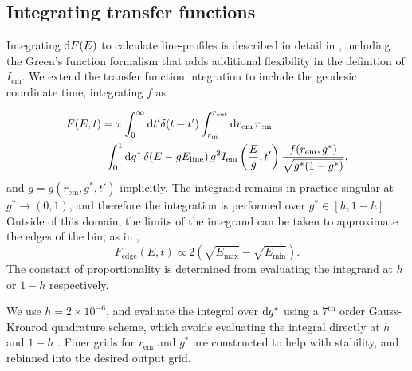 \subsection{Integrating transfer functions}

Integrating $\text{d} F(E)$ to calculate line-profiles is described in detail in \cite{dauser_broad_2010}, including the Green's function formalism that adds additional flexibility in the definition of $I_\text{em}$. We extend the transfer function integration to include the geodesic coordinate time, integrating $f$ as

\begin{align}
    \label{eq:transfer-integration}
    F(E, t) &=
    \pi
    \int_0^\infty \text{d} t^\prime \delta(t - t^\prime)
    \int_{r_\text{in}}^{r_\text{out}} \text{d} r_\text{em}\,r_\text{em} \nonumber \\
    &\ \int_0^1 \text{d} g^\ast\, \delta(E - gE_\text{line})\, g^2 I_\text{em}\left(\frac{E}{g}, t^\prime\right) \frac{f(r_\text{em}, g^\ast)}{\sqrt{g^\ast (1 - g^\ast)}},
\end{align}
\noindent and $g = g( r_\text{em}, g^\ast, t')$ implicitly. The integrand remains in practice singular at $g^\ast \rightarrow (0, 1)$, and therefore the integration is performed over $g^\ast \in [h, 1 - h]$. Outside of this domain, the limits of the integrand can be taken to approximate the edges of the bin, as in \cite{dauser_broad_2010},
\begin{equation}
   F_\text{edge}(E,t) \propto 2\left( \sqrt{E_\text{max}} - \sqrt{E_\text{min}} \right).
\end{equation}
The constant of proportionality is determined from evaluating the integrand at $h$ or $1 - h$ respectively.

We use $h = 2 \times 10^{-6}$, and evaluate the integral over $\text{d} g^\ast$ using a 7$^\text{th}$ order Gauss-Kronrod quadrature scheme, which avoids evaluating the integral directly at $h$ and $1 - h$ \citep{}. Finer grids for $r_\text{em}$ and $g^\ast$ are constructed to help with stability, and rebinned into the desired output grid. 

